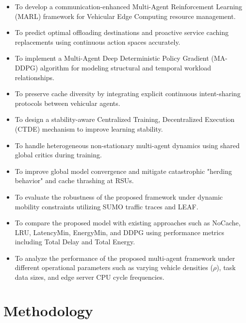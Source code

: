 \documentclass[12pt,a4paper]{report}
\begin{document}
\begin{itemize}

\item To develop a communication-enhanced Multi-Agent Reinforcement Learning (MARL) framework for Vehicular Edge Computing resource management.

\item To predict optimal offloading destinations and proactive service caching replacements using continuous action spaces accurately.

\item To implement a Multi-Agent Deep Deterministic Policy Gradient (MA-DDPG) algorithm for modeling structural and temporal workload relationships.

\item To preserve cache diversity by integrating explicit continuous intent-sharing protocols between vehicular agents.

\item To design a stability-aware Centralized Training, Decentralized Execution (CTDE) mechanism to improve learning stability.

\item To handle heterogeneous non-stationary multi-agent dynamics using shared global critics during training.

\item To improve global model convergence and mitigate catastrophic "herding behavior" and cache thrashing at RSUs.

\item To evaluate the robustness of the proposed framework under dynamic mobility constraints utilizing SUMO traffic traces and LEAF.

\item To compare the proposed model with existing approaches such as NoCache, LRU, LatencyMin, EnergyMin, and DDPG using performance metrics including Total Delay and Total Energy.

\item To analyze the performance of the proposed multi-agent framework under different operational parameters such as varying vehicle densities ($\rho$), task data sizes, and edge server CPU cycle frequencies.

\end{itemize}

\chapter{Methodology}
\label{ch:methodology}
\end{document}
